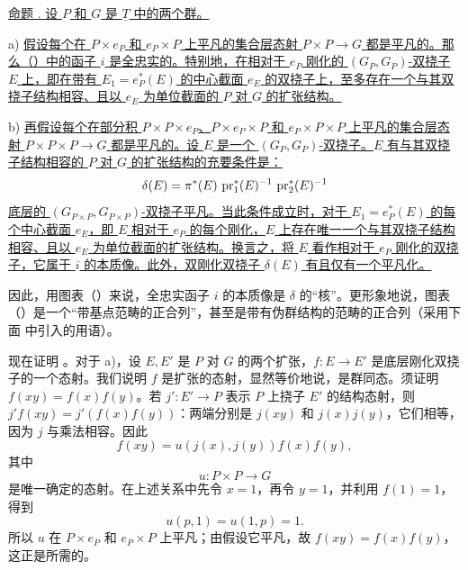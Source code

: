 \underline{命题 . 设 $P$ 和 $G$ 是 $\underline T$ 中的两个群。}

a) \underline{假设每个在 $P\times e_P$ 和 $e_P\times P$ 上平凡的集合层态射 $P\times P\longrightarrow G$ 都是平凡的。那么（）中的函子 $i$ 是全忠实的。特别地，在相对于 $e_P$ 刚化的 $(G_P,G_P)$-双挠子 $E$ 上，即在带有 $E_1=e_P^*(E)$ 的中心截面 $e_E$ 的双挠子上，至多存在一个与其双挠子结构相容、且以 $e_E$ 为单位截面的 $P$ 对 $G$ 的扩张结构。}

b) \underline{再假设每个在部分积 $P\times P\times e_P$、$P\times e_P\times P$ 和 $e_P\times P\times P$ 上平凡的集合层态射 $P\times P\times P\longrightarrow G$ 都是平凡的。设 $E$ 是一个 $(G_P,G_P)$-双挠子。$E$ 有与其双挠子结构相容的 $P$ 对 $G$ 的扩张结构的充要条件是：}
\[
 \delta(E)=\pi^*(E)\,\operatorname{pr}_1^*(E)^{-1}\,\operatorname{pr}_2^*(E)^{-1}
\]
\underline{底层的 $(G_{P\times P},G_{P\times P})$-双挠子平凡。当此条件成立时，对于 $E_1=e_P^*(E)$ 的每个中心截面 $e_E$，即 $E$ 相对于 $e_P$ 的每个刚化，$E$ 上存在唯一一个与其双挠子结构相容、且以 $e_E$ 为单位截面的扩张结构。换言之，将 $E$ 看作相对于 $e_P$ 刚化的双挠子，它属于 $i$ 的本质像。此外，双刚化双挠子 $\delta(E)$ 有且仅有一个平凡化。}


因此，用图表（）来说，全忠实函子 $i$ 的本质像是 $\delta$ 的“核”。更形象地说，图表（）是一个“带基点范畴的正合列”，甚至是带有伪群结构的范畴的正合列（采用下面  中引入的用语）。

现在证明 。对于 a)，设 $E,E'$ 是 $P$ 对 $G$ 的两个扩张，$f:E\longrightarrow E'$ 是底层刚化双挠子的一个态射。我们说明 $f$ 是扩张的态射，显然等价地说，是群同态。须证明 $f(xy)=f(x)f(y)$。若 $j':E'\longrightarrow P$ 表示 $P$ 上挠子 $E'$ 的结构态射，则 $j'f(xy)=j'(f(x)f(y))$：两端分别是 $j(xy)$ 和 $j(x)j(y)$，它们相等，因为 $j$ 与乘法相容。因此
\begin{equation*}
 f(xy)=u(j(x),j(y))f(x)f(y),
\end{equation*}
其中
\begin{equation*}
 u:P\times P\longrightarrow G
\end{equation*}
是唯一确定的态射。在上述关系中先令 $x=1$，再令 $y=1$，并利用 $f(1)=1$，得到
\begin{equation*}
 u(p,1)=u(1,p)=1.
\end{equation*}
所以 $u$ 在 $P\times e_P$ 和 $e_P\times P$ 上平凡；由假设它平凡，故 $f(xy)=f(x)f(y)$，这正是所需的。

